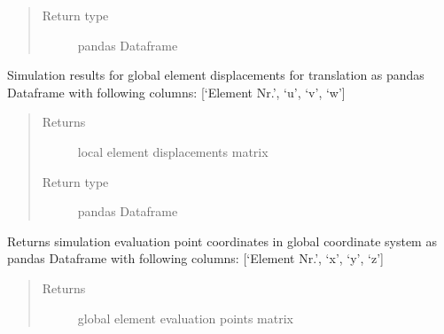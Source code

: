 \documentclass[letterpaper,10pt,english]{sphinxmanual}
\begin{document}
\begin{fulllineitems}
\begin{fulllineitems}
\begin{quote}
\begin{description}
\item[{Return type}] \leavevmode
pandas Dataframe

\end{description}\end{quote}

\end{fulllineitems}


\begin{fulllineitems}
\label{\detokenize{api:beamon.simulation.Simulation.global_element_displacements}}
Simulation results for global element displacements for translation as pandas
Dataframe with following columns:
{[}‘Element Nr.’, ‘u’, ‘v’, ‘w’{]}
\begin{quote}\begin{description}
\item[{Returns}] \leavevmode
local element displacements matrix

\item[{Return type}] \leavevmode
pandas Dataframe

\end{description}\end{quote}

\end{fulllineitems}


\begin{fulllineitems}
\label{\detokenize{api:beamon.simulation.Simulation.global_element_evaluation_points}}
Returns simulation evaluation point coordinates in global coordinate system
as pandas Dataframe with following columns:
{[}‘Element Nr.’, ‘x’, ‘y’, ‘z’{]}
\begin{quote}\begin{description}
\item[{Returns}] \leavevmode
global element evaluation points matrix


\end{description}
\end{quote}
\end{fulllineitems}
\end{fulllineitems}
\end{document}
